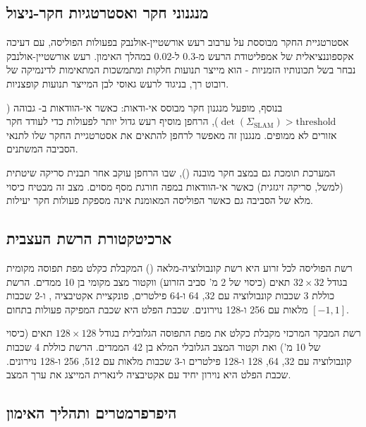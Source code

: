 \subsection{מנגנוני חקר ואסטרטגיות חקר-ניצול}
\label{sec:ch06_exploration}

אסטרטגיית החקר מבוססת על ערבוב רעש אורשטיין-אולנבק בפעולות הפוליסה, עם דעיכה אקספוננציאלית של אמפליטודת הרעש מ-0.3 ל-0.02 במהלך האימון. רעש אורשטיין-אולנבק נבחר בשל תכונותיו הזמניות - הוא מייצר תנועות חלקות ומתמשכות המתאימות לדינמיקה של רובוט רך, בניגוד לרעש גאוסי לבן המייצר תנועות קופצניות.

בנוסף, מופעל מנגנון חקר מבוסס אי-ודאות: כאשר אי-הוודאות ב- גבוהה ($\det(\Sigma_{\text{SLAM}}) > \text{threshold}$), הרחפן מוסיף רעש גדול יותר לפעולות כדי לעודד חקר אזורים לא ממופים. מנגנון זה מאפשר לרחפן להתאים את אסטרטגיית החקר שלו לתנאי הסביבה המשתנים.

המערכת תומכת גם במצב חקר מובנה (), שבו הרחפן עוקב אחר תבנית סריקה שיטתית (למשל, סריקה זיגזגית) כאשר אי-הוודאות במפה חורגת מסף מסוים. מצב זה מבטיח כיסוי מלא של הסביבה גם כאשר הפוליסה המאומנת אינה מספקת פעולות חקר יעילות.

\subsection{ארכיטקטורת הרשת העצבית}
\label{sec:ch06_network}

רשת הפוליסה לכל זרוע היא רשת קונבולוציה-מלאה () המקבלת כקלט מפת תפוסה מקומית בגודל $32 \times 32$ תאים (כיסוי של 2 מ' סביב הזרוע) ווקטור מצב מקומי בן 10 ממדים. הרשת כוללת 3 שכבות קונבולוציה עם 32, 64 ו-64 פילטרים, פונקציית אקטיבציה , ו-2 שכבות מלאות עם 256 ו-128 נוירונים. שכבת הפלט היא שכבת  המפיקה פעולות בתחום $[-1, 1]$.

רשת המבקר המרכזי מקבלת כקלט את מפת התפוסה הגלובלית בגודל $128 \times 128$ תאים (כיסוי של 10 מ') ואת וקטור המצב הגלובלי המלא בן 42 הממדים. הרשת כוללת 4 שכבות קונבולוציה עם 32, 64, 128 ו-128 פילטרים ו-3 שכבות מלאות עם 512, 256 ו-128 נוירונים. שכבת הפלט היא נוירון יחיד עם אקטיבציה לינארית המייצג את ערך המצב.

\subsection{היפרפרמטרים ותהליך האימון}
\label{sec:ch06_hyperparameters}

